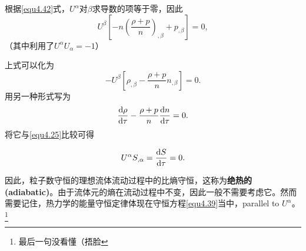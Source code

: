 根据\eqref{equ4.42}式，$U^\alpha$对$\beta$求导数的项等于零，因此
\begin{equation}
    U^\beta \left[ -n \left( \frac{\rho + p}{n} \right)_{, \beta} + p_{, \beta} \right] = 0,
\label{equ4.47}
\end{equation}
（其中利用了$U^\alpha U_\alpha = -1$）

上式可以化为
\begin{equation}
    -U^\beta \left[ \rho_{, \beta} - \frac{\rho + p}{n} n_{, \beta} \right] = 0.
\label{equ4.48}
\end{equation}
用另一种形式写为
\begin{equation}
    \frac{\mathrm{d} \rho}{\mathrm{d} \tau} - \frac{\rho + p}{n} \frac{\mathrm{d} n}{\mathrm{d} \tau} = 0.
\label{equ4.49}
\end{equation}
将它与\eqref{equ4.25}比较可得
\begin{shaded}
\begin{equation}
    U^\alpha S_{, \alpha} = \frac{\mathrm{d} S}{\mathrm{d} \tau} = 0.
\label{equ4.50}
\end{equation}
\end{shaded}
因此，粒子数守恒的理想流体流动过程中的比熵守恒，这称为\textbf{绝热的 (adiabatic)}。由于流体元的熵在流动过程中不变，因此一般不需要考虑它。然而需要记住，热力学的能量守恒定律体现在守恒方程\eqref{equ4.39}当中，parallel to $U^\alpha$。\footnote{最后一句没看懂（捂脸}

